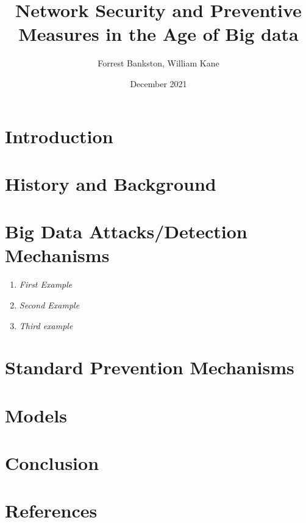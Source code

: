 \documentclass[12pt]{article}
\title{Network Security and Preventive Measures in the Age of Big data}
\author{Forrest Bankston, William Kane}
\date{December 2021}
\begin{document}
\maketitle

\begin{multicols}{2}

\begin{abstract}
\textbf {\blindtext}
\end{abstract}

\section{Introduction}

\blindtext\blindtext

\section{History and Background}

\blindtext\blindtext

\section{Big Data Attacks/Detection Mechanisms}
\begin{enumerate}
\item \emph{First Example}

\blindtext
\item \emph{Second Example}

\blindtext
\item \emph{Third example}

\end{enumerate}

\section{Standard Prevention Mechanisms}

\blindtext\blindtext

\section{Models}

\blindtext\blindtext

\section{Conclusion}

\blindtext\blindtext

\section{References}

\blindtext\blindtext
\end{multicols}
\end{document}
